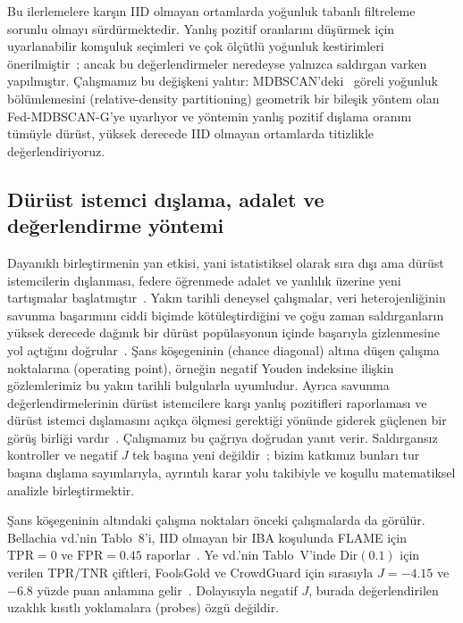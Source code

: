 \documentclass[journal]{IEEEtran}
\begin{document}
Bu ilerlemelere karşın IID olmayan ortamlarda yoğunluk tabanlı filtreleme sorunlu olmayı sürdürmektedir. Yanlış pozitif oranlarını düşürmek için uyarlanabilir komşuluk seçimleri ve çok ölçütlü yoğunluk kestirimleri önerilmiştir~\cite{ramana2026alldd}; ancak bu değerlendirmeler neredeyse yalnızca saldırgan varken yapılmıştır. Çalışmamız bu değişkeni yalıtır: MDBSCAN'deki~\cite{qian2024mdbscan} göreli yoğunluk bölümlemesini (relative-density partitioning) geometrik bir bileşik yöntem olan Fed-MDBSCAN-G'ye uyarlıyor ve yöntemin yanlış pozitif dışlama oranını tümüyle dürüst, yüksek derecede IID olmayan ortamlarda titizlikle değerlendiriyoruz.

\subsection{Dürüst istemci dışlama, adalet ve değerlendirme yöntemi}
Dayanıklı birleştirmenin yan etkisi, yani istatistiksel olarak sıra dışı ama dürüst istemcilerin dışlanması, federe öğrenmede adalet ve yanlılık üzerine yeni tartışmalar başlatmıştır~\cite{singh2023fair,touat2023bias,ajibuwa2025fairness}. Yakın tarihli deneysel çalışmalar, veri heterojenliğinin savunma başarımını ciddi biçimde kötüleştirdiğini ve çoğu zaman saldırganların yüksek derecede dağınık bir dürüst popülasyonun içinde başarıyla gizlenmesine yol açtığını doğrular~\cite{li2025heterogeneity,ye2025illusion,bellachia2026sok}. Şans köşegeninin (chance diagonal) altına düşen çalışma noktalarına (operating point), örneğin negatif Youden indeksine ilişkin gözlemlerimiz bu yakın tarihli bulgularla uyumludur. Ayrıca savunma değerlendirmelerinin dürüst istemcilere karşı yanlış pozitifleri raporlaması ve dürüst istemci dışlamasını açıkça ölçmesi gerektiği yönünde giderek güçlenen bir görüş birliği vardır~\cite{djemaa2026heterogeneity,abad2025evaluation}. Çalışmamız bu çağrıya doğrudan yanıt verir. Saldırgansız kontroller ve negatif $J$ tek başına yeni değildir~\cite{ye2025illusion,bellachia2026sok,li2024experimental}; bizim katkımız bunları tur başına dışlama sayımlarıyla, ayrıntılı karar yolu takibiyle ve koşullu matematiksel analizle birleştirmektir.

Şans köşegeninin altındaki çalışma noktaları önceki çalışmalarda da görülür. Bellachia vd.'nin Tablo~8'i, IID olmayan bir IBA koşulunda FLAME için $\mathrm{TPR}=0$ ve $\mathrm{FPR}=0.45$ raporlar~\cite{bellachia2026sok}. Ye vd.'nin Tablo~V'inde $\mathrm{Dir}(0.1)$ için verilen TPR/TNR çiftleri, FoolsGold ve CrowdGuard için sırasıyla $J=-4.15$ ve $-6.8$ yüzde puan anlamına gelir~\cite{ye2025illusion}. Dolayısıyla negatif $J$, burada değerlendirilen uzaklık kısıtlı yoklamalara (probes) özgü değildir.
\end{document}
